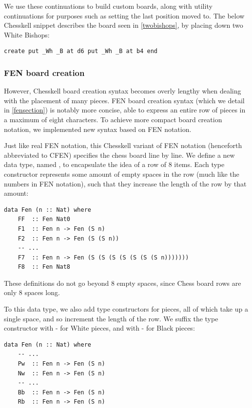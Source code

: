 We use these continuations to build custom boards, along with utility continuations for purposes such as setting the last position moved to. The below Chesskell snippet describes the board seen in \cref{twobishops}, by placing down two White Bishops:

\begin{lstlisting}
create put _Wh _B at d6 put _Wh _B at b4 end
\end{lstlisting}

\subsubsection{FEN board creation}

However, Chesskell board creation syntax becomes overly lengthy when dealing with the placement of many pieces. FEN board creation syntax (which we detail in \cref{fensection}) is notably more concise, able to express an entire row of pieces in a maximum of eight characters. To achieve more compact board creation notation, we implemented new syntax based on FEN notation.

Just like real FEN notation, this Chesskell variant of FEN notation (henceforth abbreviated to CFEN) specifies the chess board line by line. We define a new data type, named , to encapsulate the idea of a row of 8 items. Each type constructor represents some amount of empty spaces in the row (much like the numbers in FEN notation), such that they increase the length of the row by that amount:

\begin{lstlisting}
data Fen (n :: Nat) where
    FF  :: Fen Nat0
    F1  :: Fen n -> Fen (S n)
    F2  :: Fen n -> Fen (S (S n))
    -- ...
    F7  :: Fen n -> Fen (S (S (S (S (S (S (S n)))))))
    F8  :: Fen Nat8
\end{lstlisting}

These definitions do not go beyond 8 empty spaces, since Chess board rows are only 8 spaces long.

To this data type, we also add type constructors for pieces, all of which take up a single space, and so increment the length of the row. We suffix the type constructor with - for White pieces, and with - for Black pieces:

\begin{lstlisting}
data Fen (n :: Nat) where
    -- ...
    Pw  :: Fen n -> Fen (S n)
    Nw  :: Fen n -> Fen (S n)
    -- ...
    Bb  :: Fen n -> Fen (S n)
    Rb  :: Fen n -> Fen (S n)
\end{lstlisting}

